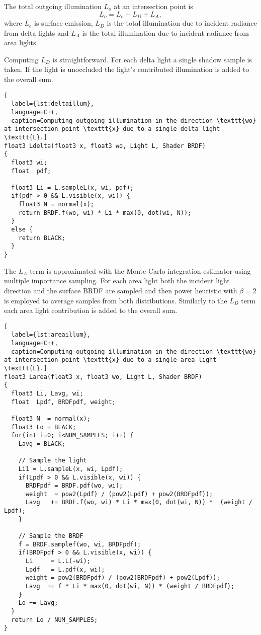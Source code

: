 The total outgoing illumination $L_{o}$ at an intersection point is
\begin{equation}
  L_{o} = L_{e} + L_{D} + L_{A},
\end{equation}
where $L_{e}$ is surface emission, $L_{D}$ is the total illumination due to incident radiance from delta lights and $L_{A}$ is the total illumination due to incident radiance from area lights.

Computing $L_{D}$ is straightforward. For each delta light a single shadow sample is taken. If the light is unoccluded the light's contributed illumination is added to the overall sum.

\begin{lstlisting}[
  label={lst:deltaillum},
  language=C++,
  caption=Computing outgoing illumination in the direction \texttt{wo} at intersection point \texttt{x} due to a single delta light \texttt{L}.]
float3 Ldelta(float3 x, float3 wo, Light L, Shader BRDF)
{
  float3 wi;
  float  pdf;

  float3 Li = L.sampleL(x, wi, pdf);
  if(pdf > 0 && L.visible(x, wi)) {
    float3 N = normal(x);
    return BRDF.f(wo, wi) * Li * max(0, dot(wi, N));
  }
  else {
    return BLACK;
  }
}
\end{lstlisting}

The $L_{A}$ term is approximated with the Monte Carlo integration estimator using multiple importance sampling. For each area light both the incident light direction and the surface BRDF are sampled and then power heuristic with $\beta=2$ is employed to average samples from both distributions. Similarly to the $L_{D}$ term each area light contribution is added to the overall sum.

\begin{lstlisting}[
  label={lst:areaillum},
  language=C++,
  caption=Computing outgoing illumination in the direction \texttt{wo} at intersection point \texttt{x} due to a single area light \texttt{L}.]
float3 Larea(float3 x, float3 wo, Light L, Shader BRDF)
{
  float3 Li, Lavg, wi;
  float  Lpdf, BRDFpdf, weight;

  float3 N  = normal(x);
  float3 Lo = BLACK;
  for(int i=0; i<NUM_SAMPLES; i++) {
    Lavg = BLACK;

    // Sample the light
    Li1 = L.sampleL(x, wi, Lpdf);
    if(Lpdf > 0 && L.visible(x, wi)) {
      BRDFpdf = BRDF.pdf(wo, wi);
      weight  = pow2(Lpdf) / (pow2(Lpdf) + pow2(BRDFpdf));
      Lavg   += BRDF.f(wo, wi) * Li * max(0, dot(wi, N)) *  (weight / Lpdf);
    }

    // Sample the BRDF
    f = BRDF.samplef(wo, wi, BRDFpdf);
    if(BRDFpdf > 0 && L.visible(x, wi)) {
      Li     = L.L(-wi);
      Lpdf   = L.pdf(x, wi);
      weight = pow2(BRDFpdf) / (pow2(BRDFpdf) + pow2(Lpdf));
      Lavg  += f * Li * max(0, dot(wi, N)) * (weight / BRDFpdf);
    }
    Lo += Lavg;
  }
  return Lo / NUM_SAMPLES;
}
\end{lstlisting}

